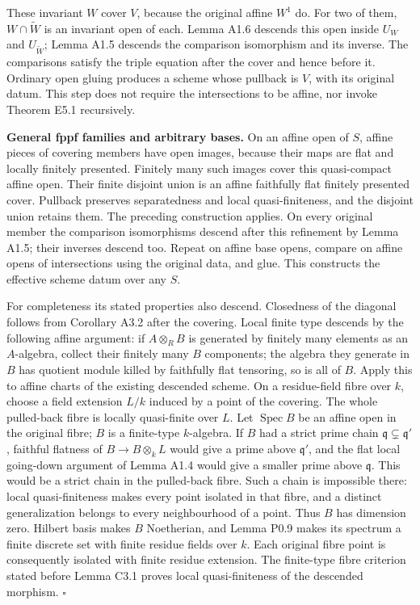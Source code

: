 \documentclass[11pt,a4paper,openany]{report}
\begin{document}
These invariant \(W\) cover \(V\), because the original affine \(W^1\) do. For two of them, \(W\cap\widetilde W\) is an invariant open of each. Lemma A1.6 descends this open inside \(U_W\) and \(U_{\widetilde W}\); Lemma A1.5 descends the comparison isomorphism and its inverse. The comparisons satisfy the triple equation after the cover and hence before it. Ordinary open gluing produces a scheme whose pullback is \(V\), with its original datum. This step does not require the intersections to be affine, nor invoke Theorem E5.1 recursively.

\textbf{General fppf families and arbitrary bases.} On an affine open of \(S\), affine pieces of covering members have open images, because their maps are flat and locally finitely presented. Finitely many such images cover this quasi-compact affine open. Their finite disjoint union is an affine faithfully flat finitely presented cover. Pullback preserves separatedness and local quasi-finiteness, and the disjoint union retains them. The preceding construction applies. On every original member the comparison isomorphisms descend after this refinement by Lemma A1.5; their inverses descend too. Repeat on affine base opens, compare on affine opens of intersections using the original data, and glue. This constructs the effective scheme datum over any \(S\).

For completeness its stated properties also descend. Closedness of the diagonal follows from Corollary A3.2 after the covering. Local finite type descends by the following affine argument: if \(A\otimes_R B\) is generated by finitely many elements as an \(A\)-algebra, collect their finitely many \(B\) components; the algebra they generate in \(B\) has quotient module killed by faithfully flat tensoring, so is all of \(B\). Apply this to affine charts of the existing descended scheme. On a residue-field fibre over \(k\), choose a field extension \(L/k\) induced by a point of the covering. The whole pulled-back fibre is locally quasi-finite over \(L\). Let \(\operatorname{Spec}B\) be an affine open in the original fibre; \(B\) is a finite-type \(k\)-algebra. If \(B\) had a strict prime chain \(\mathfrak q\subsetneq\mathfrak q'\), faithful flatness of \(B\to B\otimes_kL\) would give a prime above \(\mathfrak q'\), and the flat local going-down argument of Lemma A1.4 would give a smaller prime above \(\mathfrak q\). This would be a strict chain in the pulled-back fibre. Such a chain is impossible there: local quasi-finiteness makes every point isolated in that fibre, and a distinct generalization belongs to every neighbourhood of a point. Thus \(B\) has dimension zero. Hilbert basis makes \(B\) Noetherian, and Lemma P0.9 makes its spectrum a finite discrete set with finite residue fields over \(k\). Each original fibre point is consequently isolated with finite residue extension. The finite-type fibre criterion stated before Lemma C3.1 proves local quasi-finiteness of the descended morphism. \(\square\)
\end{document}
